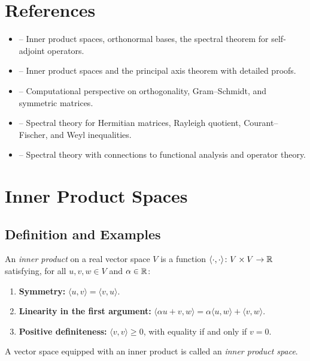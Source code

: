 \documentclass[11pt,a4paper]{article}
\begin{document}
\section{References}
\label{sec:references}

\begin{itemize}
  \item \citet[Chapters 6--7]{axler2015} -- Inner product spaces,
        orthonormal bases, the spectral theorem for self-adjoint operators.
  \item \citet[Chapter 8]{hoffman1971} -- Inner product spaces and the
        principal axis theorem with detailed proofs.
  \item \citet[Chapters 6--7]{strang2016} -- Computational perspective
        on orthogonality, Gram--Schmidt, and symmetric matrices.
  \item \citet[Chapter 4]{horn2013} -- Spectral theory for Hermitian
        matrices, Rayleigh quotient, Courant--Fischer, and Weyl
        inequalities.
  \item \citet[Chapter 8]{lax2007} -- Spectral theory with connections
        to functional analysis and operator theory.
\end{itemize}

\section{Inner Product Spaces}
\label{sec:inner_products}

\subsection{Definition and Examples}

\begin{definition}
\label{def:inner_product}
An \emph{inner product} on a real vector space $V$ is a function
$\langle \cdot, \cdot \rangle\colon V \times V \to \mathbb{R}$ satisfying, for
all $u, v, w \in V$ and $\alpha \in \mathbb{R}$:
\begin{enumerate}[nosep]
  \item \textbf{Symmetry:} $\langle u, v \rangle = \langle v, u \rangle$.
  \item \textbf{Linearity in the first argument:}
        $\langle \alpha u + v, w \rangle
        = \alpha \langle u, w \rangle + \langle v, w \rangle$.
  \item \textbf{Positive definiteness:}
        $\langle v, v \rangle \geq 0$, with equality if and only if $v = 0$.
\end{enumerate}
A vector space equipped with an inner product is called an
\emph{inner product space}.
\end{definition}
\end{document}
